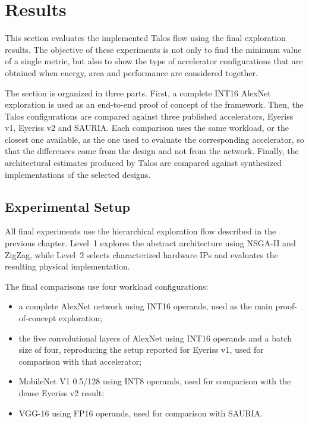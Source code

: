 \clearpage
\section{Results}
\label{sec:results}

This section evaluates the implemented Talos flow using the final
exploration results. The objective of these experiments is not only to
find the minimum value of a single metric, but also to show the type of
accelerator configurations that are obtained when energy, area and
performance are considered together.

The section is organized in three parts. First, a complete INT16
AlexNet exploration is used as an end-to-end proof of concept of the
framework. Then, the Talos configurations are compared against three
published accelerators, Eyeriss v1, Eyeriss v2 and SAURIA. Each
comparison uses the same workload, or the closest one available, as
the one used to evaluate the corresponding accelerator, so that the
differences come from the design and not from the network. Finally,
the architectural estimates produced by Talos are compared against
synthesized implementations of the selected designs.

\subsection{Experimental Setup}

All final experiments use the hierarchical exploration flow described
in the previous chapter. Level~1 explores the abstract architecture
using NSGA-II and ZigZag, while Level~2 selects characterized hardware
IPs and evaluates the resulting physical implementation.

The final comparisons use four workload configurations:

\begin{itemize}
    \item a complete AlexNet network using INT16 operands, used as the
    main proof-of-concept exploration;
    \item the five convolutional layers of AlexNet using INT16
    operands and a batch size of four, reproducing the setup reported
    for Eyeriss v1, used for comparison with that accelerator;
    \item MobileNet V1 0.5/128 using INT8 operands, used for comparison
    with the dense Eyeriss v2 result;
    \item VGG-16 using FP16 operands, used for comparison with SAURIA.
\end{itemize}

